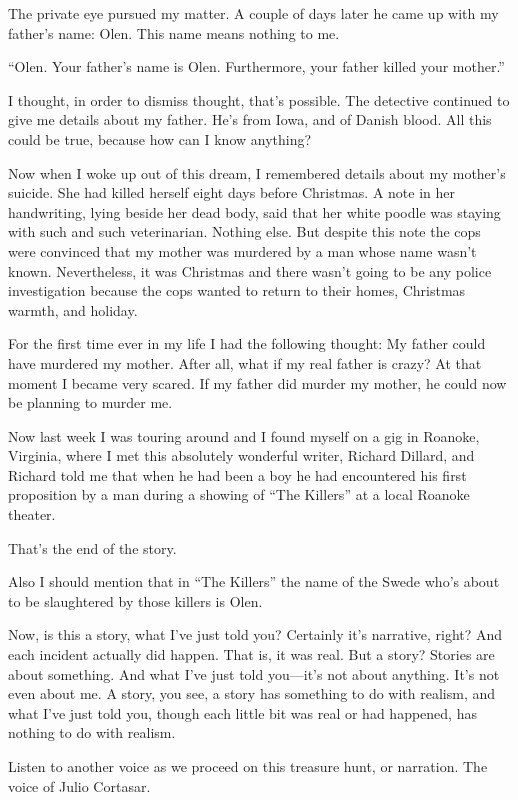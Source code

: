\documentclass[
]{memoir}
\begin{document}
The private eye pursued my matter. A couple of days later he came up
with my father's name: Olen. This name means nothing to me.

``Olen. Your father's name is Olen. Furthermore, your father killed your
mother.''

I thought, in order to dismiss thought, that's possible. The detective
continued to give me details about my father. He's from Iowa, and of
Danish blood. All this could be true, because how can I know anything?

Now when I woke up out of this dream, I remembered details about my
mother's suicide. She had killed herself eight days before Christmas. A
note in her handwriting, lying beside her dead body, said that her white
poodle was staying with such and such veterinarian. Nothing else. But
despite this note the cops were convinced that my mother was murdered by
a man whose name wasn't known. Nevertheless, it was Christmas and there
wasn't going to be any police investigation because the cops wanted to
return to their homes, Christmas warmth, and holiday.

For the first time ever in my life I had the following thought: My
father could have murdered my mother. After all, what if my real father
is crazy? At that moment I became very scared. If my father did murder
my mother, he could now be planning to murder me.

Now last week I was touring around and I found myself on a gig in
Roanoke, Virginia, where I met this absolutely wonderful writer, Richard
Dillard, and Richard told me that when he had been a boy he had
encountered his first proposition by a man during a showing of ``The
Killers'' at a local Roanoke theater.

That's the end of the story.

Also I should mention that in ``The Killers'' the name of the Swede
who's about to be slaughtered by those killers is Olen.

Now, is this a story, what I've just told you? Certainly it's narrative,
right? And each incident actually did happen. That is, it was real. But
a story? Stories are about something. And what I've just told you---it's
not about anything. It's not even about me. A story, you see, a story
has something to do with realism, and what I've just told you, though
each little bit was real or had happened, has nothing to do with
realism.

Listen to another voice as we proceed on this treasure hunt, or
narration. The voice of Julio Cortasar.
\end{document}
